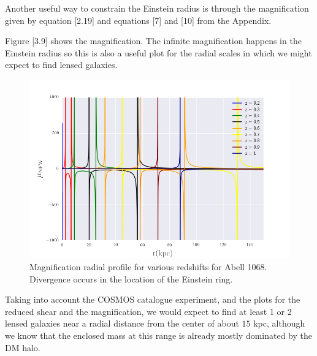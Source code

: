 Another useful way to constrain the Einstein radius is through the magnification given by equation [2.19] and equations [7] and [10] from the Appendix.
 
Figure [3.9] shows the magnification. The infinite magnification happens in the Einstein radius so this is also a useful plot for the radial scales in which we might expect to find lensed galaxies.

\begin{figure}[H]
\centering
\includegraphics[width=12cm]{images/Magnification.png}
\caption[Magnification radial profile]{Magnification radial profile for various redshifts for Abell 1068. Divergence occurs in the location of the Einstein ring.}
\end{figure}

Taking into account the COSMOS catalogue experiment, and the plots for the reduced shear and the magnification, we would expect to find at least 1 or 2 lensed galaxies near a radial distance from the center of about $15$ kpc, although we know that the enclosed mass at this range is already mostly dominated by the DM halo. 

